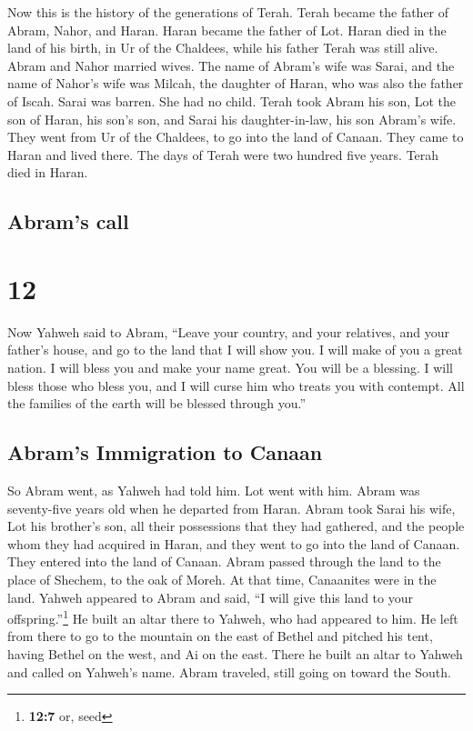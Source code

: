  Now this is the history of the generations of Terah.
Terah became the father of Abram, Nahor, and Haran. Haran became the
father of Lot.  Haran died in the land of his birth, in
Ur of the Chaldees, while his father Terah was still alive.
 Abram and Nahor married wives. The name of Abram's wife
was Sarai, and the name of Nahor's wife was Milcah, the daughter of
Haran, who was also the father of Iscah.  Sarai was
barren. She had no child.  Terah took Abram his son, Lot
the son of Haran, his son's son, and Sarai his daughter-in-law, his son
Abram's wife. They went from Ur of the Chaldees, to go into the land of
Canaan. They came to Haran and lived there.  The days of
Terah were two hundred five years. Terah died in Haran.

\hypertarget{abrams-call}{%
\subsection{Abram's call}\label{abrams-call}}

\hypertarget{section-11}{%
\section{12}\label{section-11}}

 Now Yahweh said to Abram, ``Leave your country, and your
relatives, and your father's house, and go to the land that I will show
you.  I will make of you a great nation. I will bless you
and make your name great. You will be a blessing.  I will
bless those who bless you, and I will curse him who treats you with
contempt. All the families of the earth will be blessed through you.''

\hypertarget{abrams-immigration-to-canaan}{%
\subsection{Abram's Immigration to
Canaan}\label{abrams-immigration-to-canaan}}

 So Abram went, as Yahweh had told him. Lot went with him.
Abram was seventy-five years old when he departed from Haran.
 Abram took Sarai his wife, Lot his brother's son, all
their possessions that they had gathered, and the people whom they had
acquired in Haran, and they went to go into the land of Canaan. They
entered into the land of Canaan.  Abram passed through the
land to the place of Shechem, to the oak of Moreh. At that time,
Canaanites were in the land.  Yahweh appeared to Abram and
said, ``I will give this land to your offspring.''\footnote{\textbf{12:7}
  or, seed} He built an altar there to Yahweh, who had appeared to him.
 He left from there to go to the mountain on the east of
Bethel and pitched his tent, having Bethel on the west, and Ai on the
east. There he built an altar to Yahweh and called on Yahweh's name.
 Abram traveled, still going on toward the South.

